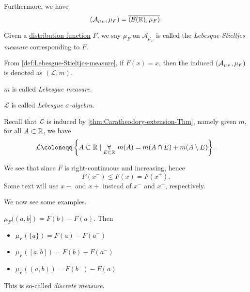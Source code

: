 Furthermore, we have
\[
	(\mathcal{A}_{\mu _F}, \mu _F) = \overline{(\mathcal{B} (\mathbb{\MakeUppercase{r}} ), \mu _F)}.
\]
\begin{definition}\label{def:Lebesgue-Stieltjes-measure}
	Given a \hyperref[def:distribution-function]{distribution function} \(F\), we say \(\mu _F\) on \(\mathcal{A} _{\mu _F}\) is called the
	\emph{Lebesgue-Stieltjes measure} corresponding to \(F\).
\end{definition}

\begin{definition*}
	From \autoref{def:Lebesgue-Stieltjes-measure}, if \(F(x)=x\), then the induced \((\mathcal{\MakeUppercase{a}} _{\mu _F}, \mu _{F})\) is denoted as \((\mathcal{L} , m)\).
	\begin{definition}\label{def:Lebesgue-measure}
		\(m\) is called \emph{Lebesgue measure}.
	\end{definition}
	\begin{definition}\label{def:Lebesgue-sigma-algebra}
		\(\mathcal{L} \) is called \emph{Lebesgue \(\sigma\)-algebra}.
	\end{definition}
\end{definition*}


\begin{remark}
	Recall that \(\mathcal{\MakeUppercase{l}} \) is induced by \autoref{thm:Caratheodory-extension-Thm}, namely given \(m\), for all \(A\subset \mathbb{\MakeUppercase{r}} \),
	we have
	\[
		\mathcal{\MakeUppercase{l}} \coloneqq \left\{A\subset \mathbb{\MakeUppercase{r}} \mid \underset{E\subset \mathbb{\MakeUppercase{r}} }{\forall }\ m(A) = m(A\cap E) + m(A\setminus E)\right\}.
	\]
\end{remark}

\begin{note}
	We see that since \(F\) is right-continuous and increasing, hence
	\[
		F(x^-)\leq F(x) = F(x^+).
	\]
	Some text will use \(x-\) and \(x+\) instead of \(x^-\) and \(x^+\), respectively.
\end{note}

We now see some examples.

\begin{eg}\label{eg:discrete-measure}
	\(\mu _F((a, b]) = F(b) - F(a)\). Then
	\begin{itemize}
		\item \(\mu _F(\{a\}) = F(a) - F(a^-)\)
		\item \(\mu _F([a, b]) = F(b) - F(a^-)\)
		\item \(\mu _F((a, b)) = F(b^-) - F(a)\)
	\end{itemize}
	This is so-called \emph{discrete measure}.
\end{eg}

